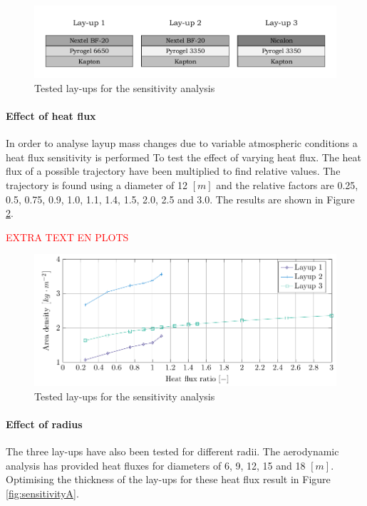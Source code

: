 \begin{figure}[ht]
	\centering
	\includegraphics{./Figure/Thermal/layersensthermal.pdf}
	\caption{Tested lay-ups for the sensitivity analysis}
	\label{fig:layersensthermal}
\end{figure}

\paragraph{Effect of heat flux}
In order to analyse layup mass changes due to variable atmospheric conditions a heat flux sensitivity is performed To test the effect of varying heat flux. The heat flux of a possible trajectory have been multiplied to find relative values. The trajectory is found using a diameter of 12 $[m]$ and the relative factors are 0.25, 0.5, 0.75, 0.9, 1.0, 1.1, 1.4, 1.5, 2.0, 2.5 and 3.0. The results are shown in Figure \ref{fig:sensitivityq}.

\textcolor{red}{EXTRA TEXT EN PLOTS}
\begin{figure}[ht]
	\centering
	\includegraphics{./Figure/Thermal/Sensitivityq.pdf}
	\caption{Tested lay-ups for the sensitivity analysis}
	\label{fig:sensitivityq}
\end{figure}

\paragraph{Effect of radius}
The three lay-ups have also been tested for different radii. The aerodynamic analysis has provided heat fluxes for diameters of 6, 9, 12, 15 and 18 $[m]$. Optimising the thickness of the lay-ups for these heat flux result in Figure \ref{fig:sensitivityA}. 

